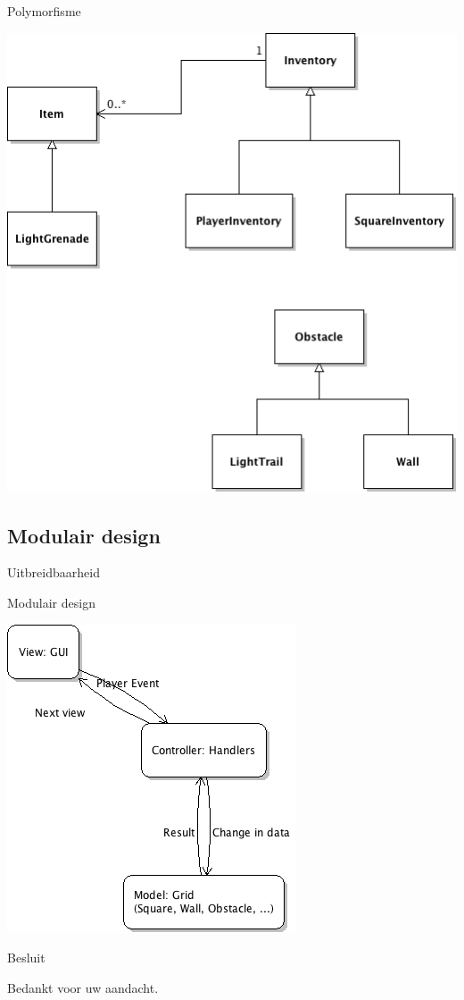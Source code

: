 \documentclass[t]{beamer}
\begin{document}
\begin{frame}[plain]{Polymorfisme}
\begin{center}
\includegraphics[width= 0.6\linewidth]{../uml/polymorphism.png}
\end{center}
\end{frame}

\subsection{Modulair design}
\begin{frame}{Uitbreidbaarheid}
\begin{multicols}{2}
\tableofcontents[currentsection]
\end{multicols}
\end{frame}

\begin{frame}[plain]{Modulair design}
\begin{center}
\includegraphics[width= 0.5\linewidth]{../uml/MVC.png}
\end{center}
\end{frame}

\begin{frame}{Besluit}
\vspace{0.8in}
\begin{center}
Bedankt voor uw aandacht.
\end{center}
\end{frame}
\end{document}

